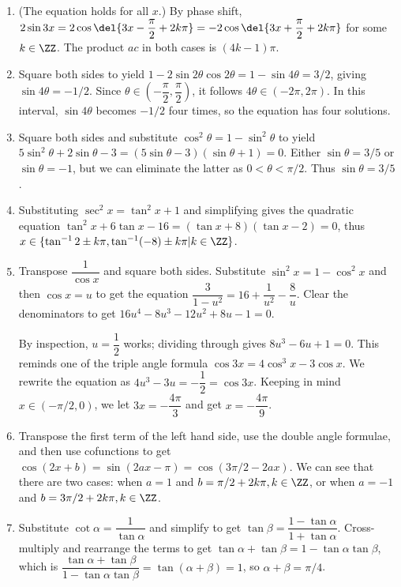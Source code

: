 \documentclass[10pt,paper=letter]{scrartcl}
\begin{document}
\begin{enumerate}

\item (The equation holds for all $x$.) By phase shift, $2\sin 3x = 2\cos \del{3x - \dfrac\pi2 + 2k\pi} = -2\cos\del{3x + \dfrac\pi2 + 2k\pi}$ for some $k \in \ZZ$. The product $ac$ in both cases is $(4k-1)\pi$.

\item Square both sides to yield $1 - 2\sin2\theta\cos2\theta = 1 - \sin4\theta = 3/2$, giving $\sin 4\theta = -1/2$. Since $\theta \in \left(-\dfrac{\pi}{2}, \dfrac{\pi}{2}\right)$, it follows $4\theta \in (-2\pi, 2\pi)$. In this interval, $\sin 4\theta$ becomes $-1/2$ four times, so the equation has four solutions.

\item Square both sides and substitute $\cos^2\theta = 1 - \sin^2\theta$ to yield $5\sin^2\theta + 2\sin\theta - 3 = (5\sin\theta - 3)(\sin\theta + 1) = 0$. Either $\sin\theta = 3/5$ or $\sin\theta = -1$, but we can eliminate the latter as $0 < \theta < \pi/2$. Thus $\sin \theta = 3/5$.

\item Substituting $\sec^2x = \tan^2x + 1$ and simplifying gives the quadratic equation $\tan^2x + 6\tan x - 16 = (\tan x + 8)(\tan x - 2) = 0$, thus $x \in \{\tan^{-1}2\pm k\pi, \tan^{-1}(-8)\pm k\pi | k \in \ZZ\}$.

\item Transpose $\dfrac1{\cos x}$ and square both sides. Substitute $\sin^2x = 1 - \cos^2x$ and then $\cos x = u$ to get the equation $\dfrac3{1-u^2} = 16 + \dfrac1{u^2} - \dfrac8u$. Clear the denominators to get $16u^4 - 8u^3 - 12u^2 + 8u - 1 = 0$.

By inspection, $u = \dfrac12$ works; dividing through gives $8u^3 - 6u + 1 = 0$. This reminds one of the triple angle formula $\cos 3x = 4\cos^3x - 3\cos x$. We rewrite the equation as $4u^3 - 3u = -\dfrac12 = \cos3x$. Keeping in mind $x \in (-\pi/2, 0)$, we let $3x = -\dfrac{4\pi}3$ and get $x = -\dfrac{4\pi}9$.

\item Transpose the first term of the left hand side, use the double angle formulae, and then use cofunctions to get $\cos(2x + b) = \sin(2ax - \pi) = \cos(3\pi/2 - 2ax)$. We can see that there are two cases: when $a = 1$ and $b = \pi/2 + 2k\pi, k \in \ZZ$, or when $a = -1$ and $b = 3\pi/2 + 2k\pi, k \in \ZZ$.

\item Substitute $\cot \alpha = \dfrac{1}{\tan \alpha}$ and simplify to get $\tan \beta = \dfrac{1 - \tan\alpha}{1 + \tan\alpha}$. Cross-multiply and rearrange the terms to get $\tan \alpha + \tan \beta = 1 - \tan\alpha\tan\beta$, which is $\dfrac{\tan\alpha + \tan\beta}{1 - \tan\alpha\tan\beta} = \tan(\alpha + \beta) = 1$, so $\alpha + \beta = \pi/4$.


\end{enumerate}
\end{document}
